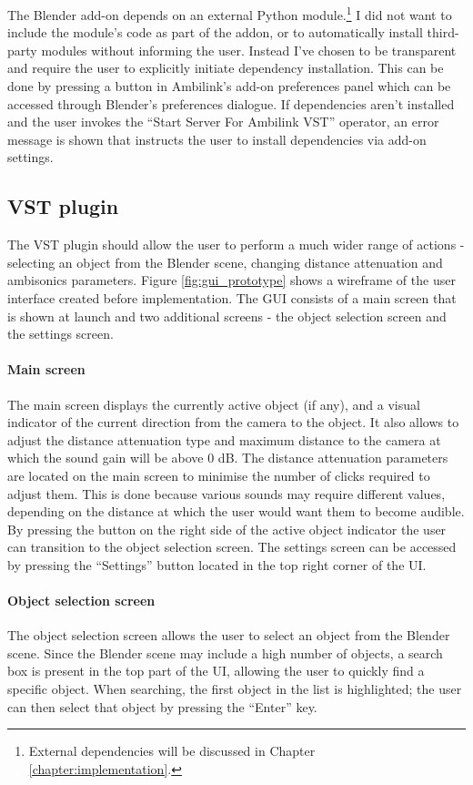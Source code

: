 The Blender add-on depends on an external Python module.\footnote{External dependencies will be discussed in Chapter \ref{chapter:implementation}.}
I did not want to include the module's code as part of the addon, or to automatically install third-party modules without informing the user.
Instead I've chosen to be transparent and require the user to explicitly initiate dependency installation.
This can be done by pressing a button in Ambilink's add-on preferences panel which can be accessed through Blender's preferences dialogue.
If dependencies aren't installed and the user invokes the ``Start Server For Ambilink VST'' operator,
an error message is shown that instructs the user to install dependencies via add-on settings.

\subsection{VST plugin}

The VST plugin should allow the user to perform a much wider range of actions - selecting an object from the Blender scene, changing distance attenuation and ambisonics parameters.
Figure \ref{fig:gui_prototype} shows a wireframe of the user interface created before implementation.
The GUI consists of a main screen that is shown at launch and two additional screens - the object selection screen and the settings screen.

\paragraph*{Main screen}
The main screen displays the currently active object (if any), and a visual indicator of the current direction from the camera to the object.
It also allows to adjust the distance attenuation type and maximum distance to the camera at which the sound gain will be above 0 dB.
The distance attenuation parameters are located on the main screen to minimise the number of clicks required to adjust them. 
This is done because various sounds may require different values, 
depending on the distance at which the user would want them to become audible.
By pressing the button on the right side of the active object indicator the user can transition to the object selection screen.
The settings screen can be accessed by pressing the ``Settings'' button located in the top right corner of the UI.

\paragraph*{Object selection screen}
The object selection screen allows the user to select an object from the Blender scene. Since the Blender scene may include a 
high number of objects, a search box is present in the top part of the UI, allowing the user to quickly find a specific object.
When searching, the first object in the list is highlighted; the user can then select that object by pressing the ``Enter'' key.

